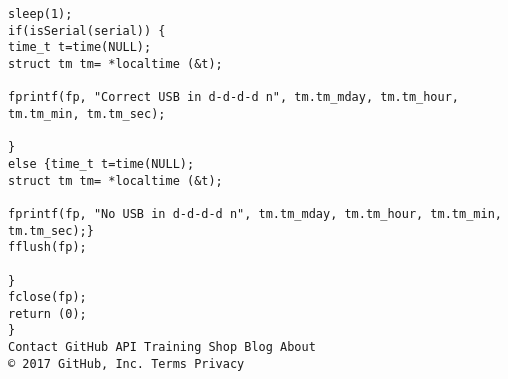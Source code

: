 \documentclass[12pt,a4paper]{scrartcl}
\begin{document}
\begin{verbatim}
sleep(1);
if(isSerial(serial)) {
time_t t=time(NULL);
struct tm tm= *localtime (&t);

fprintf(fp, "Correct USB in d-d-d-d n", tm.tm_mday, tm.tm_hour, tm.tm_min, tm.tm_sec);

}
else {time_t t=time(NULL);
struct tm tm= *localtime (&t);

fprintf(fp, "No USB in d-d-d-d n", tm.tm_mday, tm.tm_hour, tm.tm_min, tm.tm_sec);}
fflush(fp);

}
fclose(fp);
return (0);
}
Contact GitHub API Training Shop Blog About
© 2017 GitHub, Inc. Terms Privacy 

\end{verbatim}
	\newpage
\end{document}
